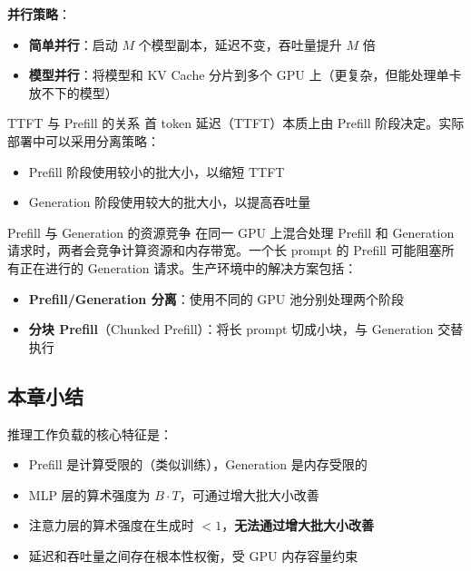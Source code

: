 \documentclass[a4paper]{article}
\begin{document}
\textbf{并行策略}：

\begin{itemize}
    \item \textbf{简单并行}：启动 $M$ 个模型副本，延迟不变，吞吐量提升 $M$ 倍
    \item \textbf{模型并行}：将模型和 KV Cache 分片到多个 GPU 上（更复杂，但能处理单卡放不下的模型）
\end{itemize}

\begin{knowledgebox}{TTFT 与 Prefill 的关系}
首 token 延迟（TTFT）本质上由 Prefill 阶段决定。实际部署中可以采用分离策略：
\begin{itemize}
    \item Prefill 阶段使用较小的批大小，以缩短 TTFT
    \item Generation 阶段使用较大的批大小，以提高吞吐量
\end{itemize}
\end{knowledgebox}

\begin{warningbox}{Prefill 与 Generation 的资源竞争}
在同一 GPU 上混合处理 Prefill 和 Generation 请求时，两者会竞争计算资源和内存带宽。一个长 prompt 的 Prefill 可能阻塞所有正在进行的 Generation 请求。生产环境中的解决方案包括：
\begin{itemize}
    \item \textbf{Prefill/Generation 分离}：使用不同的 GPU 池分别处理两个阶段
    \item \textbf{分块 Prefill}（Chunked Prefill）：将长 prompt 切成小块，与 Generation 交替执行
\end{itemize}
\end{warningbox}

\subsection{本章小结}

推理工作负载的核心特征是：
\begin{itemize}
    \item Prefill 是计算受限的（类似训练），Generation 是内存受限的
    \item MLP 层的算术强度为 $B \cdot T$，可通过增大批大小改善
    \item 注意力层的算术强度在生成时 $<1$，\textbf{无法通过增大批大小改善}
    \item 延迟和吞吐量之间存在根本性权衡，受 GPU 内存容量约束
\end{itemize}

\end{document}
